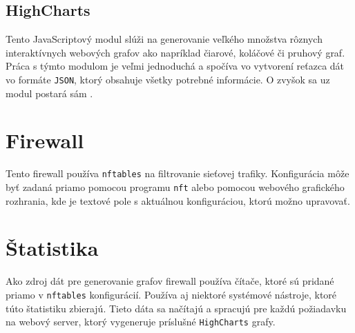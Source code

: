 		\subsection{HighCharts}
		\label{highcharts}
			Tento JavaScriptový modul slúži na generovanie veľkého množstva rôznych interaktívnych webových
			grafov ako napríklad čiarové, koláčové či pruhový graf. Práca s týmto modulom je veľmi jednoduchá
			a spočíva vo vytvorení reťazca dát vo formáte \texttt{JSON}, ktorý obsahuje všetky potrebné 
			informácie. O zvyšok sa uz modul postará sám \cite{highcharts}.
		        
	\section{Firewall}
		Tento firewall používa \texttt{nftables} na filtrovanie sieťovej trafiky. Konfigurácia môže byť 
		zadaná priamo pomocou programu \texttt{nft} alebo pomocou webového grafického rozhrania, kde je
		textové pole s aktuálnou konfiguráciou, ktorú možno upravovať. 
		
	\section{Štatistika}
		Ako zdroj dát pre generovanie grafov firewall používa čítače, ktoré sú pridané priamo v \texttt{nftables}
		konfigurácií. Používa aj niektoré systémové nástroje, ktoré túto štatistiku zbierajú. Tieto dáta sa 
		načítajú a spracujú pre každú požiadavku na webový server, ktorý vygeneruje príslušné \texttt{HighCharts}
		grafy.
